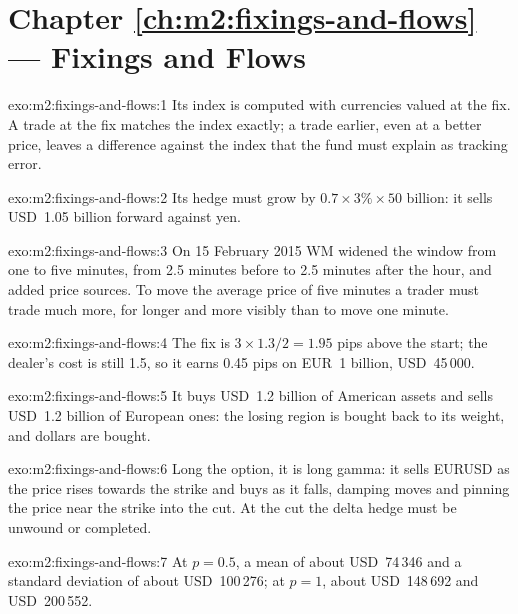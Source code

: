\section*{Chapter \ref{ch:m2:fixings-and-flows} --- Fixings and Flows}

\begin{solution}{exo:m2:fixings-and-flows:1}
Its index is computed with currencies valued at the fix. A trade at the fix
matches the index exactly; a trade earlier, even at a better price, leaves a
difference against the index that the fund must explain as tracking error.
\end{solution}

\begin{solution}{exo:m2:fixings-and-flows:2}
Its hedge must grow by $0.7 \times 3\% \times 50$ billion: it sells USD~1.05
billion forward against yen.
\end{solution}

\begin{solution}{exo:m2:fixings-and-flows:3}
On 15 February 2015 WM widened the window from one to five minutes, from 2.5
minutes before to 2.5 minutes after the hour, and added price sources. To move
the average price of five minutes a trader must trade much more, for longer and
more visibly than to move one minute.
\end{solution}

\begin{solution}{exo:m2:fixings-and-flows:4}
The fix is $3 \times 1.3/2 = 1.95$ pips above the start; the dealer's cost is still
1.5, so it earns 0.45 pips on EUR~1 billion, USD~45\,000.
\end{solution}

\begin{solution}{exo:m2:fixings-and-flows:5}
It buys USD~1.2 billion of American assets and sells USD~1.2 billion of European
ones: the losing region is bought back to its weight, and dollars are bought.
\end{solution}

\begin{solution}{exo:m2:fixings-and-flows:6}
Long the option, it is long gamma: it sells EURUSD as the price rises towards the
strike and buys as it falls, damping moves and pinning the price near the strike
into the cut. At the cut the delta hedge must be unwound or completed.
\end{solution}

\begin{solution}{exo:m2:fixings-and-flows:7}
At $p = 0.5$, a mean of about USD~74\,346 and a standard deviation of about
USD~100\,276; at $p = 1$, about USD~148\,692 and USD~200\,552.
\end{solution}

